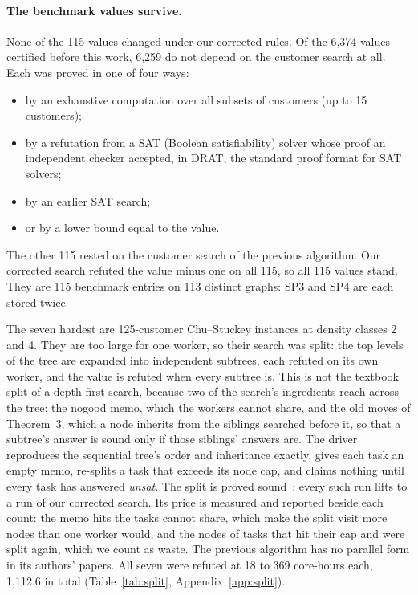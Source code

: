 \paragraph{The benchmark values survive.} None of the 115 values changed under
our corrected rules. Of the 6,374 values certified before this work, 6,259 do
not depend on the customer search at all. Each was proved in one of four ways:
\begin{itemize}
\item by an exhaustive computation over all subsets of customers (up to 15
  customers);
\item by a refutation from a SAT (Boolean satisfiability) solver whose proof an
  independent checker accepted, in DRAT, the standard proof format for SAT
  solvers;
\item by an earlier SAT search;
\item or by a lower bound equal to the value.
\end{itemize}
The other 115 rested on the customer search
of the previous algorithm. Our corrected search refuted the value minus one on
all 115, so all 115 values stand. They are 115 benchmark entries on 113
distinct graphs: SP3 and SP4 are each stored twice.

The seven hardest are 125-customer Chu--Stuckey instances at density classes 2
and 4. They are too large for one worker, so their search was split:
the top levels of the tree are expanded into independent subtrees, each
refuted on its own worker, and the value is refuted when every subtree is.
This is not the textbook split of a depth-first search, because two of the
search's ingredients reach across the tree: the nogood memo, which the
workers cannot share, and the old moves of Theorem~3, which a node inherits
from the siblings searched before it, so that a subtree's answer is sound
only if those siblings' answers are. The driver reproduces the sequential
tree's order and inheritance exactly, gives each task an empty memo, re-splits
a task that exceeds its node cap, and claims nothing until every task has
answered \emph{unsat}. The split is proved sound~: every such
run lifts to a run of our corrected search. Its price is measured and
reported beside each count: the memo hits the tasks cannot share, which make
the split visit more nodes than one worker would, and the nodes of tasks
that hit their cap and were split again, which we count as waste. The
previous algorithm has no parallel form in its authors' papers. All seven were refuted at 18 to 369
core-hours each, 1,112.6 in total (Table~\ref{tab:split},
Appendix~\ref{app:split}).

